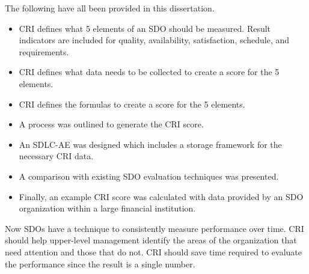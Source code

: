 \documentclass[SDSUThesis.tex]{subfiles}
\begin{document}
    The following have all been provided in this dissertation.
    \begin{itemize}
        \item CRI defines what 5 elements of an SDO should be measured.
            Result indicators are included for quality, availability, satisfaction,
            schedule, and requirements. 
        \item CRI defines what data needs to be collected to create a 
            score for the 5 elements.
        \item CRI defines the formulas to create a score for the 5 elements.
        \item A process was outlined to generate the CRI score.
        \item An SDLC-AE was designed which includes a storage 
            framework for the necessary CRI data.
        \item A comparison with existing SDO evaluation techniques was presented.
        \item Finally, an example CRI score was calculated with data provided by
            an SDO organization within a large financial institution.
    \end{itemize}
    
    Now SDOs have a technique to consistently measure performance over time.  CRI
    should help upper-level management identify the areas of the organization
    that need attention and those that do not.  CRI should save time required to 
    evaluate the performance since the result is a single number.  
    
    
\end{document}
